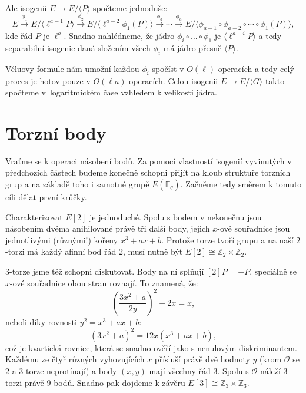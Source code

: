 \documentclass[12pt]{report}
\begin{document}
Ale isogenii $E \longrightarrow E/\langle P \rangle$ spočteme jednoduše:
\begin{equation*}
E \stackrel{\phi_1}{\longrightarrow} E/\langle \ell^{a-1} P \rangle \stackrel{\phi_2}{\longrightarrow}  E/\langle \ell^{a-2} \phi_1 (P) \rangle \stackrel{\phi_3}{\longrightarrow} \cdots \stackrel{\phi_{a}}{\longrightarrow} E/\langle \phi_{a-1} \circ \phi_{a-2} \circ \cdots \circ \phi_1 (P) \rangle,
\end{equation*}
kde řád $P$ je $\ell^a$. Snadno nahlédneme, že jádro $\phi_i \circ \dots \circ \phi_1$ je $\langle \ell^{a-i} P \rangle$ a tedy separabilní isogenie daná složením všech $\phi_i$ má jádro přesně $\langle P \rangle$.

Véluovy formule nám umožní každou $\phi_i$ spočíst v $O(\ell)$ operacích a tedy celý proces je hotov pouze v $O(\ell a)$ operacích. Celou isogenii $E \longrightarrow E/\langle G \rangle$ takto spočteme v~logaritmickém čase vzhledem k velikosti jádra.

\section{Torzní body}

Vraťme se k operaci násobení bodů. Za pomocí vlastností isogenií vyvinutých v předchozích částech budeme konečně schopni přijít na kloub struktuře torzních grup a na základě toho i samotné grupě $E(\mathbb{F}_q)$. Začněme tedy směrem k tomuto cíli dělat první krůčky.

Charakterizovat $E[2]$ je jednoduché. Spolu s bodem v nekonečnu jsou násobením dvěma anihilované právě tři další body, jejich $x$-ové souřadnice jsou jednotlivými (různými!) kořeny $x^3+ax+b$. Protože torze tvoří grupu a na naší $2$-torzi má každý afinní bod řád $2$, musí nutně být $E[2] \cong \mathbb{Z}_2 \times \mathbb{Z}_2$.

$3$-torze jsme též schopni diskutovat. Body na ní splňují $[2]P = -P$, speciálně se $x$-ové souřadnice obou stran rovnají. To znamená, že:
\begin{equation*}
\left(\frac{3x^2+a}{2y}\right)^2 -2x = x,
\end{equation*}
neboli díky rovnosti $y^2 = x^3+ax+b$:
\begin{equation*}
(3x^2+a)^2 = 12x(x^3+ax+b),
\end{equation*}
což je kvartická rovnice, která se snadno ověří jako s nenulovým diskriminantem. Každému ze čtyř různých vyhovujících $x$ přísluší právě dvě hodnoty $y$ (krom $\mathcal{O}$ se $2$ a $3$-torze neprotínají) a body $(x,y)$ mají všechny řád $3$. Spolu s $\mathcal{O}$ náleží $3$-torzi právě $9$ bodů. Snadno pak dojdeme k závěru $E[3] \cong \mathbb{Z}_3 \times \mathbb{Z}_3$.
\end{document}
